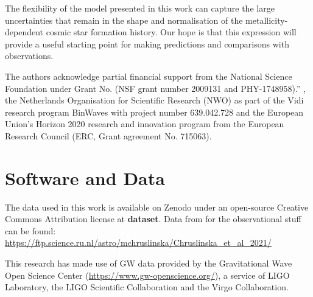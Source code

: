 \documentclass[twocolumn]{aastex631}
\newcommand{\SFRDzZ}{\ensuremath{\mathcal{S}(Z,z)}\xspace}
\newcommand{\todo}[1]{{\color{purple}\bf{#1}}}
\begin{document}
The flexibility of the model presented in this work can capture the large uncertainties that remain in the shape and normalisation of the metallicity-dependent cosmic star formation history. 
Our hope is that this expression will provide a useful starting point for making predictions and comparisons with observations.




\begin{acknowledgments}
The authors acknowledge partial financial support from the  National Science Foundation under Grant No. (NSF grant number 2009131  and PHY-1748958).”
, the Netherlands Organisation for Scientific Research (NWO) as part of the Vidi research program BinWaves with project number 639.042.728 and the European Union’s Horizon 2020 research and innovation program from the European Research Council (ERC, Grant agreement No. 715063). 
\end{acknowledgments}


\section*{Software and Data}
The data used in this work is available on Zenodo under an open-source Creative Commons Attribution license at \todo{dataset}.
Data from \cite{Chruslinska+2021} for the observational stuff can be found: \url{https://ftp.science.ru.nl/astro/mchruslinska/Chruslinska_et_al_2021/}

This research has made use of GW data provided by the Gravitational Wave Open Science Center (\url{https://www.gw-openscience.org/}), a service of LIGO Laboratory, the LIGO Scientific Collaboration and the Virgo Collaboration. 
\end{document}
